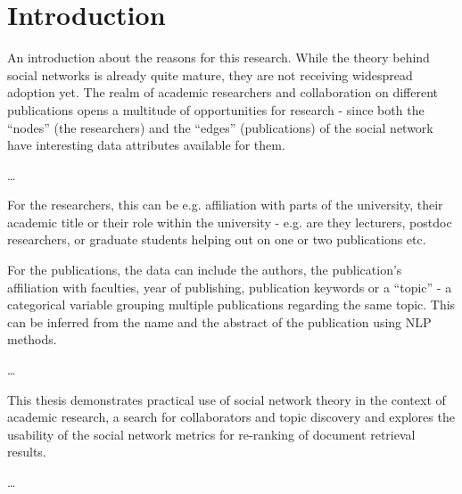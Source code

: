 \chapter*{Introduction}

An introduction about the reasons for this research. 
While the theory behind social networks is already quite mature, they are not receiving widespread adoption yet.
The realm of academic researchers and collaboration on different publications opens a multitude of opportunities for research - since both the ``nodes'' (the researchers) and the ``edges'' (publications) of the social network have interesting data attributes available for them. 

\dots

For the researchers, this can be e.g. affiliation with parts of the university, their academic title or their role within the university - e.g. are they lecturers, postdoc researchers, or graduate students helping out on one or two publications etc.

For the publications, the data can include the authors, the publication's affiliation with faculties, year of publishing, publication keywords or a ``topic'' - a categorical variable grouping multiple publications regarding the same topic. This can be inferred from the name and the abstract of the publication using NLP methods.

\dots

This thesis demonstrates practical use of social network theory in the context of academic research, a search for collaborators and topic discovery and explores the usability of the social network metrics for re-ranking of document retrieval results.

\dots